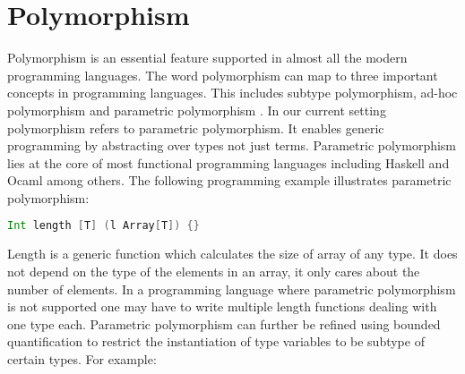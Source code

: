 \begin{comment}
\paragraph*{Existing problems in Ceylon}
In general, a term of type $A$ is always assignable to any supertype of $A$.
But in Ceylon, the checking of assignability is not complete to
subtyping.
Although the subtyping relation holds between \lstinline{v}'s
(declarative) type and \lstinline{Integer}, \lstinline{v}
is not assignable to \lstinline{Integer}, and the following program
cannot be accepted by Ceylon's compiler.

\begin{lstlisting}
	< Character | Integer > & < String | Integer > v = 100;
	switch (v)
	case (is Integer) { print("Integer: ``v``"); }
\end{lstlisting}
\end{comment}






\section{Polymorphism}

Polymorphism is an essential feature supported in almost all the modern
programming languages. The word polymorphism can map to three
important concepts in programming languages. This includes
subtype polymorphism, ad-hoc polymorphism 
\citep{castagna1995calculus, cardelli1985understanding, wadler1989make} and 
parametric polymorphism \citep{cardelli1985understanding, canning1989f}. 
In our current setting polymorphism refers to
parametric polymorphism.
It enables generic programming by abstracting over types not just terms.
Parametric polymorphism lies at the core of most functional programming languages
including Haskell and Ocaml among others. The following programming example
illustrates parametric polymorphism:

\begin{lstlisting}[language=Scala]
  Int length [T] (l Array[T]) {}
\end{lstlisting}

\noindent Length is a generic function which calculates the size
of array of any type. It does not depend on the type of the
elements in an array, it only cares about the number of elements.
In a programming language where parametric polymorphism is not
supported one may have to write multiple length functions dealing
with one type each. Parametric polymorphism can further be 
refined using bounded quantification
to restrict the instantiation of type variables to be subtype of
certain types. For example:

